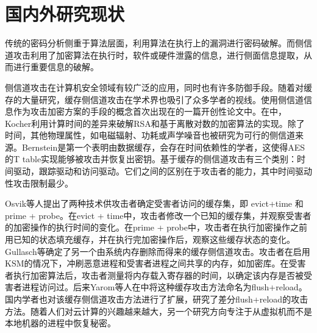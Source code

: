 \section{国内外研究现状}
传统的密码分析侧重于算法层面，利用算法在执行上的漏洞进行密码破解。而侧信道攻击利用了加密算法在执行时，软件或硬件泄露的信息，进行侧面信息提取，从而进行重要信息的破解。

侧信道攻击在计算机安全领域有较广泛的应用\cite{kocher1999differential,kocher1996timing}，同时也有许多防御手段\cite{王崇2021缓存侧信道防御研究综述}。随着对缓存的大量研究，缓存侧信道攻击在学术界也吸引了众多学者的视线。使用侧信道信息作为攻击加密方案的手段的概念首次出现在\cite{kocher1996timing}的一篇开创性论文中。在\cite{kocher1996timing}中，Kocher利用计算时间的差异来破解RSA和基于离散对数的加密算法的实现。除了时间，其他物理属性，如电磁辐射\cite{genkin2016ecdsa}、功耗\cite{kocher1999differential}或声学噪音\cite{genkin2014rsa}也被研究为可行的侧信道来源。Bernstein\cite{bernstein2005cache}是第一个表明由数据缓存，会存在时间依赖性的学者，这使得AES\cite{bernstein2005cache}的T table实现能够被攻击并恢复出密钥。基于缓存的侧信道攻击有三个类别：时间驱动\cite{bernstein2005cache}，跟踪驱动\cite{aciiccmez2006trace}和访问驱动\cite{percival2005cache}。它们之间的区别在于攻击者的能力，其中时间驱动性攻击限制最少。

Osvik等人\cite{osvik2006cache}提出了两种技术供攻击者确定受害者访问的缓存集，即 evict+time 和 prime + probe。在evict + time中，攻击者修改一个已知的缓存集，并观察受害者的加密操作的执行时间的变化。在prime + probe中，攻击者在执行加密操作之前用已知的状态填充缓存，并在执行完加密操作后，观察这些缓存状态的变化。 Gullasch等\cite{gullasch2011cache}确定了另一个由系统内存删除而得来的缓存侧信道攻击。攻击者在启用KSM的情况下，冲刷恶意进程和受害者进程之间共享的内存，如加密库。在受害者执行加密算法后，攻击者测量将内存载入寄存器的时间，以确定该内存是否被受害者进程访问过。后来Yarom等人在\cite{yarom2014flush+}中将这种缓存攻击方法命名为flush+reload。国内学者也对该缓存侧信道攻击方法进行了扩展，研究了差分flush+reload的攻击方法\cite{袁稚炜2019基于差分}。随着人们对云计算的兴趣越来越大，另一个研究方向\cite{ristenpart2009hey,zhang2012cross}专注于从虚拟机而不是本地机器的进程中恢复秘密。

